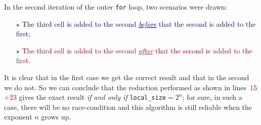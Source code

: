 \documentclass[a4paper,11pt]{article}
\newcommand{\rows}[2]{lines~\textcolor{red}{#1}$\div$\textcolor{red}{#2}}
\begin{document}
\noindent In the second iteration of the outer \texttt{for} loop, two scenarios were drawn:
\begin{itemize}
  \item[$\star$] \textcolor{blue}{The third cell is added to the second \emph{\underline{before}} that the second is added to the first;}
  \item[$\star$] \textcolor{red}{The third cell is added to the second \emph{\underline{after}} that the second is added to the first.}
\end{itemize}
It is clear that in the first case we get the correct result and that in the second we do not. So we can conclude that
the reduction performed as shown in \rows{15}{23} gives the exact result \emph{if and only if} \texttt{local\_size}$=2^{n}$;
for sure, in such a case, there will be no race-condition and this algorithm is still reliable when the exponent $n$ grows up.
\end{document}
